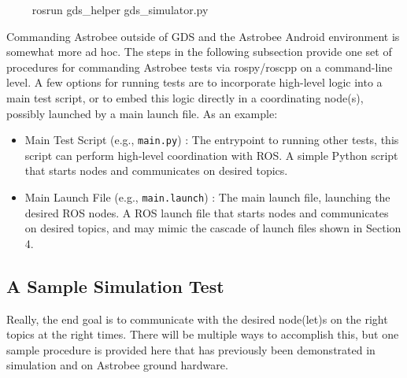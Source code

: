 \documentclass{article}
\begin{document}
\begin{markdown}
~~~~
rosrun gds_helper gds_simulator.py
~~~~
\end{markdown}

Commanding Astrobee outside of GDS and the Astrobee Android environment is somewhat more ad hoc. The steps in the following subsection provide one set of procedures for commanding Astrobee tests via rospy/roscpp on a command-line level. A few options for running tests are to incorporate high-level logic into a main test script, or to embed this logic directly in a coordinating node(s), possibly launched by a main launch file. As an example:
\begin{itemize}
    \item Main Test Script (e.g., \texttt{main.py}) : The entrypoint to running other tests, this script can perform high-level coordination with ROS. A simple Python script that starts nodes and communicates on desired topics.
    \item Main Launch File (e.g., \texttt{main.launch}) : The main launch file, launching the desired ROS nodes. A ROS launch file that starts nodes and communicates on desired topics, and may mimic the cascade of launch files shown in Section 4.
\end{itemize}


\subsection{A Sample Simulation Test}

Really, the end goal is to communicate with the desired node(let)s on the right topics at the right times. There will be multiple ways to accomplish this, but one sample procedure is provided here that has previously been demonstrated in simulation and on Astrobee ground hardware.
\end{document}
